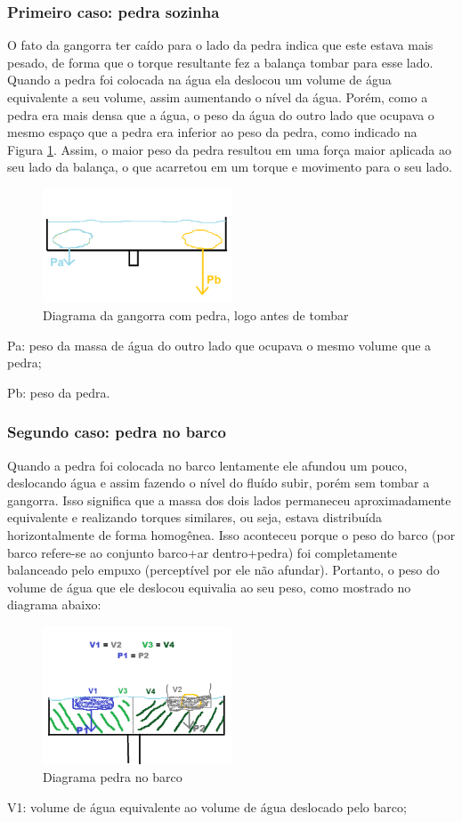 \subsubsection{Primeiro caso: pedra sozinha}
O fato da gangorra ter caído para o lado da pedra indica que este estava mais pesado, de forma que o torque resultante fez a balança tombar para esse lado. Quando a pedra foi colocada na água ela deslocou um volume de água equivalente a seu volume, assim aumentando o nível da água. Porém, como a pedra era mais densa que a água, o peso da água do outro lado que ocupava o mesmo espaço que a pedra era inferior ao peso da pedra, como indicado na Figura \ref{figGangorra}. Assim, o maior peso da pedra resultou em uma força maior aplicada ao seu lado da balança, o que acarretou em um torque e movimento para o seu lado.
\begin{figure}[H]
    \centering
    \includegraphics[width=0.5\textwidth]{fig/Gangorra.png}
    \caption{Diagrama da gangorra com pedra, logo antes de tombar}
    \label{figGangorra}
\end{figure}
Pa: peso da massa de água do outro lado que ocupava o mesmo volume que a pedra;

Pb: peso da pedra.

\subsubsection{Segundo caso: pedra no barco}
Quando a pedra foi colocada no barco lentamente ele afundou um pouco, deslocando água e assim fazendo o nível do fluído subir, porém sem tombar a gangorra. Isso significa que a massa dos dois lados permaneceu aproximadamente equivalente e realizando torques similares, ou seja, estava distribuída horizontalmente de forma homogênea. Isso aconteceu porque o peso do barco (por barco refere-se ao conjunto barco+ar dentro+pedra) foi completamente balanceado pelo empuxo (perceptível por ele não afundar). Portanto, o peso do volume de água que ele deslocou equivalia ao seu peso, como mostrado no diagrama abaixo:
\begin{figure}[H]
    \centering
    \includegraphics[width=0.5\textwidth]{fig/Gangorra2.png}
    \caption{Diagrama pedra no barco}
\end{figure}
V1: volume de água equivalente ao volume de água deslocado pelo barco;

